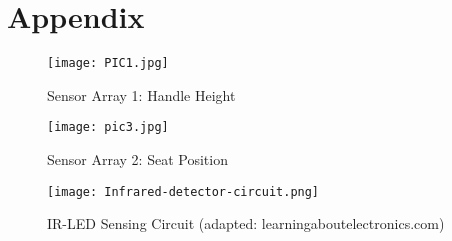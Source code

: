 \documentclass[letterpaper]{article} %
\begin{document}
\section{Appendix}
\begin{figure}[!htb]
    	\centering
        	\caption{Sensor Array 1: Handle Height}
    	\texttt{[image: PIC1.jpg]}
\end{figure}
\begin{figure}[!htb]
    	\centering
        	\caption{Sensor Array 2: Seat Position}
    	\texttt{[image: pic3.jpg]}
\end{figure}
\clearpage
\begin{figure}[!htb]
    	\centering
        	\caption{IR-LED Sensing Circuit (adapted: learningaboutelectronics.com)}
    	\texttt{[image: Infrared-detector-circuit.png]}
\end{figure}
\end{document}
